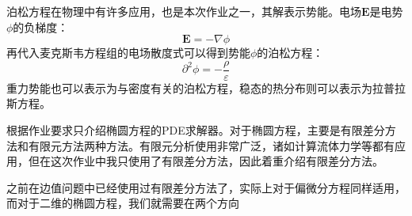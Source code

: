 \documentclass[UTF8,a4paper,10pt]{ctexart}
\begin{document}
\begin{multicols}{2}
            泊松方程在物理中有许多应用，也是本次作业之一，其解表示势能。电场$\bm{E}$是电势$\phi$的负梯度：
            \begin{equation}
                \bm{E} = -\nabla\phi
            \end{equation}
            再代入麦克斯韦方程组的电场散度式可以得到势能$\phi$的泊松方程：
            \begin{equation}
                \partial^2\phi = -\frac{\rho}{\varepsilon}
            \end{equation}
            重力势能也可以表示为与密度有关的泊松方程，稳态的热分布则可以表示为拉普拉斯方程。\par
            根据作业要求只介绍椭圆方程的PDE求解器。对于椭圆方程，主要是有限差分方法和有限元方法两种方法。有限元分析使用非常广泛，诸如计算流体力学等都有应用，但在这次作业中我只使用了有限差分方法，因此着重介绍有限差分方法。\par
            之前在边值问题中已经使用过有限差分方法了，实际上对于偏微分方程同样适用，而对于二维的椭圆方程，我们就需要在两个方向\par
\end{multicols}
\end{document}
